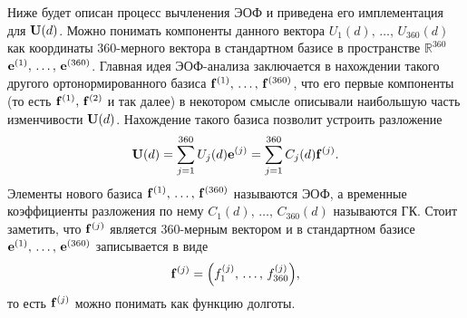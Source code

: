 Ниже будет описан процесс вычленения ЭОФ \cite[Гл. 6]{Zhang_Moore_2015} и приведена его имплементация для $\vb{U}(d)$. Можно понимать компоненты данного вектора $U_1(d),\, \ldots,\, U_{360}(d)$ как координаты 360-мерного вектора в стандартном базисе в пространстве $\mathbb{R}^{360}$ $\vb{e}^{(1)},\, \ldots,\, \vb{e}^{(360)}$. Главная идея ЭОФ-анализа заключается в нахождении такого другого ортонормированного базиса $\vb{f}^{(1)},\, \ldots,\, \vb{f}^{(360)}$, что его первые компоненты (то есть  $\vb{f}^{(1)},\, \vb{f}^{(2)}$ и так далее) в некотором смысле описывали наибольшую часть изменчивости $\vb{U}(d)$. Нахождение такого базиса позволит устроить разложение
\begin{equation}
    \label{eq:decomp}
    \vb{U}(d) = \sum\limits_{j=1}^{360} U_j(d) \vb{e}^{(j)} = \sum\limits_{j=1}^{360} C_j(d) \vb{f}^{(j)}.
\end{equation}
Элементы нового базиса $\vb{f}^{(1)},\, \ldots,\, \vb{f}^{(360)}$ называются ЭОФ, а временные коэффициенты разложения по нему $C_1(d),\, \ldots,\, C_{360}(d)$ называются ГК. Стоит заметить, что $\vb{f}^{(j)}$ является 360-мерным вектором и в стандартном базисе $\vb{e}^{(1)},\, \ldots,\, \vb{e}^{(360)}$ записывается в виде
\begin{equation}
    \vb{f}^{(j)} = \qty({f}_1^{(j)},\, \ldots,\, {f}_{360}^{(j)}),
\end{equation}
то есть $\vb{f}^{(j)}$ можно понимать как функцию долготы.

